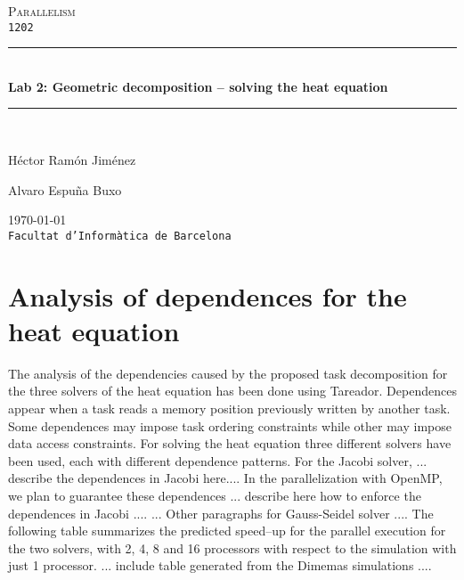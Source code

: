 \documentclass[a4paper,11pt]{article}
\begin{document}
\begin{titlepage}
\begin{center}
\textsc{\Large Parallelism}
\\
\texttt{1202}
\\[1.5cm]
\rule{\linewidth}{0.5mm}
\\[0.4cm]
{\huge
\bfseries
Lab 2: Geometric decomposition – solving the heat equation
\\[0.4cm]
}
\rule{\linewidth}{0.5mm}
\\[2.5cm]
\begin{minipage}{0.4\textwidth}
\begin{flushleft}
\large
Héctor Ramón Jiménez
\end{flushleft}
\end{minipage}
\begin{minipage}{0.4\textwidth}
\begin{flushright}
\large
Alvaro Espuña Buxo
\end{flushright}
\end{minipage}
\vfill
{\large
\today
}
\\
{\large
\texttt{Facultat d'Informàtica de Barcelona}
}
\end{center}
\end{titlepage}
\section{Analysis of dependences for the heat equation}
The analysis of the dependencies caused by the proposed task decomposition for the three solvers of the
  heat equation has been done using Tareador. Dependences appear when a task reads a memory position
  previously written by another task. Some dependences may impose task ordering constraints while other
  may impose data access constraints. For solving the heat equation three different solvers have been used,
  each with different dependence patterns. For the Jacobi solver, {... describe the dependences in Jacobi
  here...}. In the parallelization with OpenMP, we plan to guarantee these dependences { ... describe here
  how to enforce the dependences in Jacobi ...}. { ... Other paragraphs for Gauss-Seidel solver ...}.
  The following table summarizes the predicted speed–up for the parallel execution for the two solvers,
  with 2, 4, 8 and 16 processors with respect to the simulation with just 1 processor. {... include table
  generated from the Dimemas simulations ...}.
\end{document}
